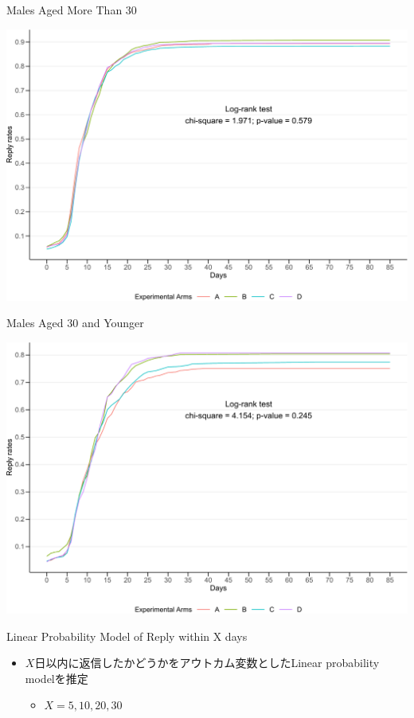 \documentclass[
      aspectratio=169,
        12pt,
    ]{beamer}
\providecommand{\tightlist}{%
  \setlength{\itemsep}{0pt}\setlength{\parskip}{0pt}}
\begin{document}
\begin{frame}{Males Aged More Than 30}
\protect\hypertarget{males-aged-more-than-30}{}
\begin{center}\includegraphics[width=0.75\linewidth]{report_files/figure-beamer/plot-surv-male-over30-1} \end{center}
\end{frame}

\begin{frame}{Males Aged 30 and Younger}
\protect\hypertarget{males-aged-30-and-younger}{}
\begin{center}\includegraphics[width=0.75\linewidth]{report_files/figure-beamer/plot-surv-male-under30-1} \end{center}
\end{frame}

\begin{frame}{Linear Probability Model of Reply within X days}
\protect\hypertarget{linear-probability-model-of-reply-within-x-days}{}
\begin{itemize}
\tightlist
\item
  \(X\)日以内に返信したかどうかをアウトカム変数としたLinear probability modelを推定

  \begin{itemize}
  \tightlist
  \item
    \(X = 5, 10, 20, 30\)
  \end{itemize}
\end{itemize}
\end{frame}
\end{document}
